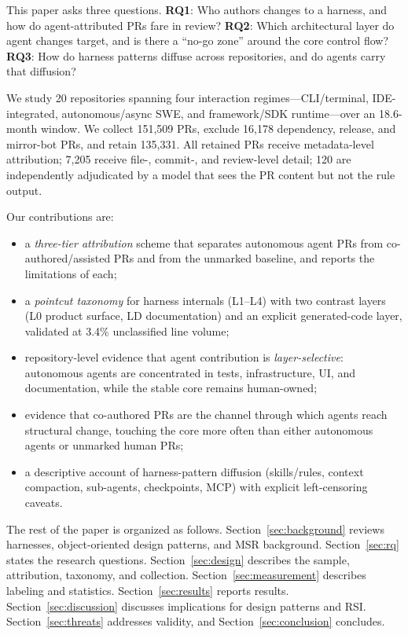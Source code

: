 \documentclass[sigconf,review]{acmart}
\begin{document}
This paper asks three questions. \textbf{RQ1}: Who authors changes to a harness, and how do agent-attributed PRs fare in review? \textbf{RQ2}: Which architectural layer do agent changes target, and is there a ``no-go zone'' around the core control flow? \textbf{RQ3}: How do harness patterns diffuse across repositories, and do agents carry that diffusion?

We study 20 repositories spanning four interaction regimes---CLI/terminal, IDE-integrated, autonomous/async SWE, and framework/SDK runtime---over an 18.6-month window. We collect 151,509 PRs, exclude 16,178 dependency, release, and mirror-bot PRs, and retain 135,331. All retained PRs receive metadata-level attribution; 7,205 receive file-, commit-, and review-level detail; 120 are independently adjudicated by a model that sees the PR content but not the rule output.

Our contributions are:
\begin{itemize}
\item a \emph{three-tier attribution} scheme that separates autonomous agent PRs from co-authored/assisted PRs and from the unmarked baseline, and reports the limitations of each;
\item a \emph{pointcut taxonomy} for harness internals (L1--L4) with two contrast layers (L0 product surface, LD documentation) and an explicit generated-code layer, validated at 3.4\% unclassified line volume;
\item repository-level evidence that agent contribution is \emph{layer-selective}: autonomous agents are concentrated in tests, infrastructure, UI, and documentation, while the stable core remains human-owned;
\item evidence that co-authored PRs are the channel through which agents reach structural change, touching the core more often than either autonomous agents or unmarked human PRs;
\item a descriptive account of harness-pattern diffusion (skills/rules, context compaction, sub-agents, checkpoints, MCP) with explicit left-censoring caveats.
\end{itemize}

The rest of the paper is organized as follows. Section~\ref{sec:background} reviews harnesses, object-oriented design patterns, and MSR background. Section~\ref{sec:rq} states the research questions. Section~\ref{sec:design} describes the sample, attribution, taxonomy, and collection. Section~\ref{sec:measurement} describes labeling and statistics. Section~\ref{sec:results} reports results. Section~\ref{sec:discussion} discusses implications for design patterns and RSI. Section~\ref{sec:threats} addresses validity, and Section~\ref{sec:conclusion} concludes.
\end{document}
